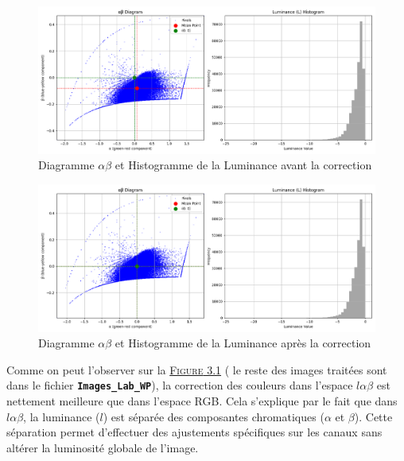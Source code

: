 \documentclass[10pt, a4paper]{extarticle}
\numberwithin{equation}{section}
\numberwithin{figure}{section}
\begin{document}
\begin{figure}[h!]
\begin{center}
\includegraphics[width=15cm]{image007.png}
\end{center}
\label{figure3.2}
\caption{Diagramme $\alpha\beta$ et Histogramme de la Luminance avant la correction}
\end{figure} 

\begin{figure}[h!]
\begin{center}
\includegraphics[width=15cm]{image008.png}
\end{center}
\label{figure3.3}
\caption{Diagramme $\alpha\beta$ et Histogramme de la Luminance après la correction}
\end{figure} 

\par Comme on peut l'observer sur la \hyperref[figure3.1]{\textsc{Figure} 3.1} ( le reste des images traitées sont dans le fichier \colorbox{gray!15}{\texttt{\textbf{Images\_Lab\_WP}}}), la correction des couleurs dans l'espace \( l\alpha\beta \) est nettement meilleure que dans l'espace RGB. Cela s'explique par le fait que dans \( l\alpha\beta \), la luminance (\( l \)) est séparée des composantes chromatiques (\( \alpha \) et \( \beta \)). Cette séparation permet d'effectuer des ajustements spécifiques sur les canaux sans altérer la luminosité globale de l'image.
\end{document}
